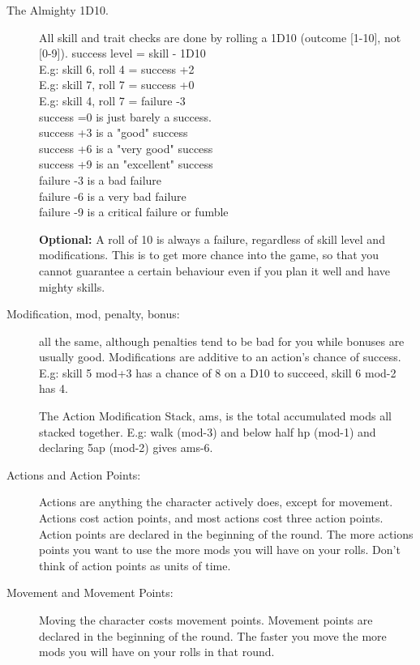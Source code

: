 \begin{description}

\item[The Almighty 1D10.] All skill and trait checks are done by rolling a 1D10 (outcome [1-10], not [0-9]).
success level = skill - 1D10 \\
E.g: skill 6, roll 4 = success +2 \\
E.g: skill 7, roll 7 = success +0 \\
E.g: skill 4, roll 7 = failure -3 \\
success =0 is just barely a success. \\
success +3 is a "good" success \\
success +6 is a "very good" success \\
success +9 is an "excellent" success \\
failure -3 is a bad failure \\
failure -6 is a very bad failure \\
failure -9 is a critical failure or fumble

\textbf{Optional:} A roll of 10 is always a failure, regardless of skill level and modifications. This is to get more chance into the game, so that you cannot guarantee a certain behaviour even if you plan it well and have mighty skills.

\item[Modification, mod, penalty, bonus:] all the same, although penalties tend to be bad for you while bonuses are usually good. Modifications are additive to an action's chance of success. \\
E.g: skill 5 mod+3 has a chance of 8 on a D10 to succeed, skill 6 mod-2 has 4.

The Action Modification Stack, ams, is the total accumulated mods all stacked together. E.g: walk (mod-3) and below half hp (mod-1) and declaring 5ap (mod-2) gives ams-6.

\item[Actions and Action Points:]
Actions are anything the character actively does, except for movement. Actions cost action points, and most actions cost three action points.
Action points are declared in the beginning of the round. The more actions points you want to use the more mods you will have on your rolls.
Don't think of action points as units of time.

\item[Movement and Movement Points:]
Moving the character costs movement points. Movement points are declared in the beginning of the round. The faster you move the more mods you will have on your rolls in that round.


\end{description}
